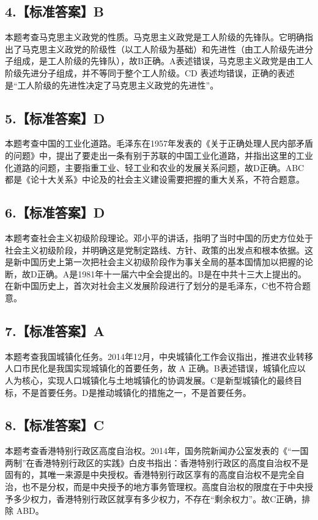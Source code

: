 \documentclass[UTF8,11pt]{ctexart}
\begin{document}
\subsection*{4.【标准答案】B}

本题考查马克思主义政党的性质。马克思主义政党是工人阶级的先锋队。它明确指出了马克思主义政党的阶级性（以工人阶级为基础）和先进性（由工人阶级先进分子组成，是工人阶级的先锋队），故B正确。A表述错误，马克思主义政党是由工人阶级先进分子组成，并不等同于整个工人阶级。CD 表述均错误，正确的表述是“工人阶级的先进性决定了马克思主义政党的先进性”。


\subsection*{5.【标准答案】D}

本题考查中国的工业化道路。毛泽东在1957年发表的《关于正确处理人民内部矛盾的问题》中，提出了要走出一条有别于苏联的中国工业化道路，并指出这里的工业化道路的问题，主要指重工业、轻工业和农业的发展关系问题，故D正确。ABC 都是《论十大关系》中论及的社会主义建设需要把握的重大关系，不符合题意。


\subsection*{6.【标准答案】D}

本题考查社会主义初级阶段理论。邓小平的讲话，指明了当时中国的历史方位处于社会主义初级阶段，并明确这是党制定路线、方针、政策的出发点和根本依据。这是新中国历史上第一次把社会主义初级阶段作为事关全局的基本国情加以把握的论断，故D正确。A是1981年十一届六中全会提出的。B是在中共十三大上提出的。在新中国历史上，首次对社会主义发展阶段进行了划分的是毛泽东，C也不符合题意。


\subsection*{7.【标准答案】A}

本题考查我国城镇化任务。2014年12月，中央城镇化工作会议指出，推进农业转移人口市民化是我国实现城镇化的首要任务，故 A 正确。B表述错误，城镇化应以人为核心，实现人口城镇化与土地城镇化的协调发展。C是新型城镇化的最终目标，不是首要任务。D是推动城镇化的措施之一，不是首要任务。


\subsection*{8.【标准答案】C}

本题考查香港特别行政区高度自治权。2014年，国务院新闻办公室发表的《“一国两制”在香港特别行政区的实践》白皮书指出：香港特别行政区的高度自治权不是固有的，其唯一来源是中央授权。香港特别行政区享有的高度自治权不是完全自治，也不是分权，而是中央授予的地方事务管理权。高度自治权的限度在于中央授予多少权力，香港特别行政区就享有多少权力，不存在“剩余权力”。故C正确，排除 ABD。
\end{document}
